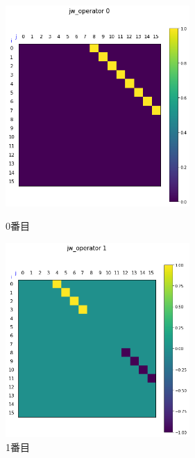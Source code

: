 \documentclass[a4paper, 10pt, dvipdfmx]{jlreq}
\begin{document}
\begin{figure}[htbp]
    \begin{minipage}{0.45\hsize}
        \begin{center}
            \includegraphics[width=70mm]{jw_operators/0.png}
        \end{center}
        \caption{0番目}
    \end{minipage}
    \begin{minipage}{0.45\hsize}
        \begin{center}
            \includegraphics[width=70mm]{jw_operators/1.png}
        \end{center}
        \caption{1番目}
    \end{minipage}
\end{figure}
\end{document}

